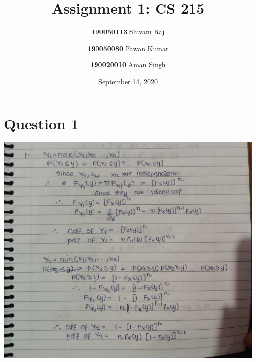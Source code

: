 \documentclass{article}
\title{Assignment 1: CS 215}
\author{
  \textbf{190050113} Shivam Raj
  \and
  \textbf{190050080} Pawan Kumar
  \and
  \textbf{190020010} Aman Singh
}
\date{September 14, 2020}
\theoremstyle{remark}
\begin{document}
\maketitle
\tableofcontents

{}

\section{Question 1}
\includegraphics[width=\textwidth, height=\textheight, keepaspectratio]{1.jpeg} \par
\end{document}
